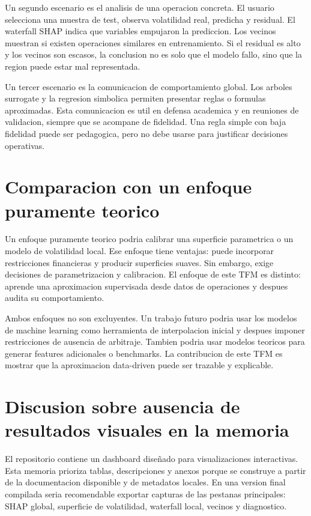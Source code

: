Un segundo escenario es el analisis de una operacion concreta. El usuario selecciona una muestra de test, observa volatilidad real, predicha y residual. El waterfall SHAP indica que variables empujaron la prediccion. Los vecinos muestran si existen operaciones similares en entrenamiento. Si el residual es alto y los vecinos son escasos, la conclusion no es solo que el modelo fallo, sino que la region puede estar mal representada.

Un tercer escenario es la comunicacion de comportamiento global. Los arboles surrogate y la regresion simbolica permiten presentar reglas o formulas aproximadas. Esta comunicacion es util en defensa academica y en reuniones de validacion, siempre que se acompane de fidelidad. Una regla simple con baja fidelidad puede ser pedagogica, pero no debe usarse para justificar decisiones operativas.

\section{Comparacion con un enfoque puramente teorico}

Un enfoque puramente teorico podria calibrar una superficie parametrica o un modelo de volatilidad local. Ese enfoque tiene ventajas: puede incorporar restricciones financieras y producir superficies suaves. Sin embargo, exige decisiones de parametrizacion y calibracion. El enfoque de este TFM es distinto: aprende una aproximacion supervisada desde datos de operaciones y despues audita su comportamiento.

Ambos enfoques no son excluyentes. Un trabajo futuro podria usar los modelos de machine learning como herramienta de interpolacion inicial y despues imponer restricciones de ausencia de arbitraje. Tambien podria usar modelos teoricos para generar features adicionales o benchmarks. La contribucion de este TFM es mostrar que la aproximacion data-driven puede ser trazable y explicable.

\section{Discusion sobre ausencia de resultados visuales en la memoria}

El repositorio contiene un dashboard diseñado para visualizaciones interactivas. Esta memoria prioriza tablas, descripciones y anexos porque se construye a partir de la documentacion disponible y de metadatos locales. En una version final compilada seria recomendable exportar capturas de las pestanas principales: SHAP global, superficie de volatilidad, waterfall local, vecinos y diagnostico.


